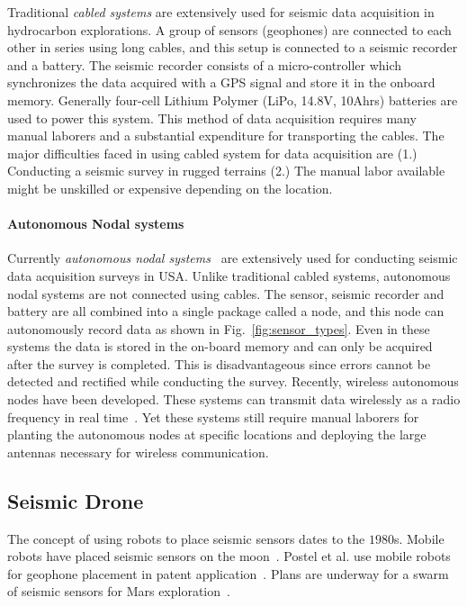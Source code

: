  Traditional \emph{cabled systems} are extensively used for seismic data acquisition in hydrocarbon explorations. A group of sensors (geophones) are connected to each other in series using long cables, and this setup is connected to a seismic recorder and a battery. The seismic recorder consists of a micro-controller which synchronizes the data acquired with a GPS signal and store it in the onboard memory. Generally four-cell Lithium Polymer (LiPo, 14.8V, 10Ahrs) batteries are used to power this system. This method of data acquisition requires many manual laborers and a substantial expenditure for transporting the cables. The major difficulties faced in using cabled system for data acquisition are (1.) Conducting a seismic survey in rugged terrains (2.) The manual labor available might be unskilled or expensive depending on the location.  
 
 \paragraph{Autonomous Nodal systems}

 Currently \emph{autonomous nodal systems}~\cite{wood1998distributed} are extensively used for conducting seismic data acquisition surveys in USA. Unlike traditional cabled systems, autonomous nodal systems are not connected using cables. The sensor, seismic recorder and battery are all combined into a single package called a node, and this node can autonomously record data as shown in Fig.~\ref{fig:sensor_types}. Even in these systems the data is stored in the on-board memory and can only be acquired after the survey is completed. This is disadvantageous since errors cannot be detected and rectified while conducting the survey. Recently, wireless autonomous nodes have been developed. These systems can transmit data wirelessly as a radio frequency in real time~\cite{jiang2015geophysical}. Yet these systems still require manual laborers for planting the autonomous nodes at specific locations and deploying the large antennas necessary for wireless communication.
 
\subsection{Seismic Drone}  

The concept of using robots to place seismic sensors dates to the $1980$s. Mobile robots have placed seismic sensors on the moon~\cite{LSisMSE81}. Postel et al. use mobile robots for geophone placement in patent application~\cite{DSSMaA14}. Plans are underway for a swarm of seismic sensors for Mars exploration~\cite{MAPL2006}.


